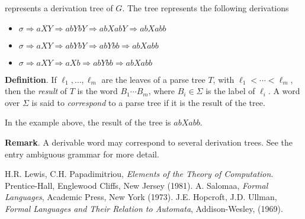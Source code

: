 \documentclass[12pt]{article}
\begin{document}
represents a derivation tree of $G$.  The tree represents the following derivations 
\begin{itemize}
\item $\sigma \Rightarrow aXY \Rightarrow abYbY \Rightarrow abXabY \Rightarrow abXabb$
\item $\sigma \Rightarrow aXY \Rightarrow abYbY \Rightarrow abYbb \Rightarrow abXabb$
\item $\sigma \Rightarrow aXY \Rightarrow aXb \Rightarrow abYbb \Rightarrow abXabb$
\end{itemize}

\textbf{Definition}.  If $\ell_1, \ldots, \ell_m$ are the leaves of a parse tree $T$, with $\ell_1 < \cdots < \ell_m$, then the \emph{result} of $T$ is the word $B_1\cdots B_m$, where $B_i\in \Sigma$ is the label of $\ell_i$.  A word over $\Sigma$ is said to \emph{correspond} to a parse tree if it is the result of the tree.

In the example above, the result of the tree is $abXabb$.

\textbf{Remark}.  A derivable word may correspond to several derivation trees.  See the entry ambiguous grammar for more detail.

\begin{thebibliography}{9}
 H.R. Lewis, C.H. Papadimitriou, {\em Elements of the Theory of Computation}. Prentice-Hall, Englewood Cliffs, New Jersey (1981).
 A. Salomaa, {\em Formal Languages}, Academic Press, New York (1973).
 J.E. Hopcroft, J.D. Ullman, {\em Formal Languages and Their Relation to Automata}, Addison-Wesley, (1969).
\end{thebibliography}
\end{document}
